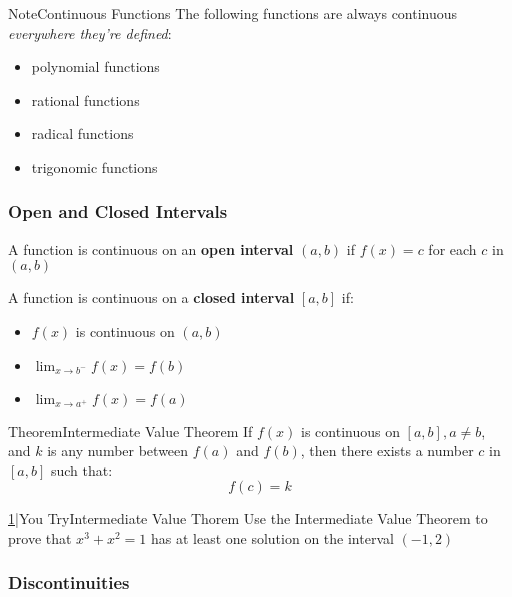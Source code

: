 \documentclass{MathNotes}
\newenvironment{note}[1]{\begin{YellowBox}{Note}{#1}}{\end{YellowBox}}
\newenvironment{theorem}[1]{\begin{GrayBox}{Theorem}{#1}}{\end{GrayBox}}
\newenvironment{practice}[2]{\begin{PurpleBox}{\texorpdfstring{#1}\Big|You Try}{#2}}{\end{PurpleBox}}
\begin{document}
\begin{note}{Continuous Functions}
    The following functions are always continuous \textit{everywhere
    they're defined}:
    \begin{itemize}
        \item polynomial functions
        \item rational functions
        \item radical functions
        \item trigonomic functions
    \end{itemize}
\end{note}

\subsubsection{Open and Closed Intervals}\label{sec:1.3.1}
A function is continuous on an \textbf{open interval} $(a, b)$ if
$f(x)=c$ for each $c$ in $(a, b)$

A function is continuous on a \textbf{closed interval} $[a, b]$ if:
\begin{itemize}
    \item $f(x)$ is continuous on $(a, b)$
    \item $\lim_{x\to b^-}f(x)=f(b)$
    \item $\lim_{x\to a^+}f(x)=f(a)$
\end{itemize}

\begin{theorem}{Intermediate Value Theorem}
    If $f(x)$ is continuous on $[a, b], a\neq b$, and $k$ is any number
    between $f(a)$ and $f(b)$, then there exists a number $c$ in
    $[a, b]$ such that: $$f(c)=k$$
\end{theorem}

\begin{practice}{\hyperref[ans:1.3.1-1]{1}}{Intermediate Value Thorem}
    \label{prac:1.3.1-1}
    Use the Intermediate Value Theorem to prove that $x^3+x^2=1$ has at least
    one solution on the interval $(-1, 2)$
\end{practice}

\subsubsection{Discontinuities}
\end{document}
